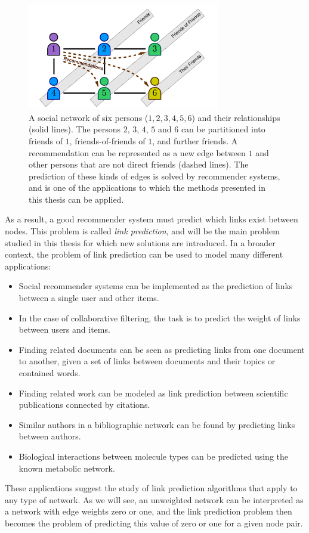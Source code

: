 \documentclass[11pt,a4paper]{book}
\newcommand{\wOnePointFive}{0.75}
\begin{document}
\begin{figure}[h!]
  \centering
  \includegraphics[width=\wOnePointFive\textwidth]{img-pdf/recommender}
  \caption{
    A social network of six persons ($1,2,3,4,5,6$) and
    their relationships (solid lines).  The persons $2$, $3$, $4$, $5$
    and $6$ can be partitioned into friends of $1$, friends-of-friends
    of $1$, and further friends.  A recommendation can be represented as
    a new edge between $1$ and other persons that are not direct friends
    (dashed lines).  The prediction of these kinds of edges is solved by
    recommender systems, and is one of the applications to which the
    methods presented in this thesis can be applied.
  }
  \label{fig:example-recommender}
\end{figure}

As a result, a good recommender system must predict which links exist
between nodes.  
This problem is called \emph{link prediction}, and will
be the main problem studied in this thesis for which new solutions are
introduced. 
In a broader context, the problem of
link prediction can be used to model many different applications: 
\begin{itemize}
\item Social recommender systems can be implemented as the prediction of
  links between a single user and other items. 
\item In the case of collaborative filtering, the task is to
  predict the weight of links between users and items. 
\item Finding related documents can be seen as predicting links from one
  document to another, given a set of links between documents and their topics or
  contained words. 
\item Finding related work can be modeled as link prediction between
  scientific publications connected by citations. 
\item Similar authors in a bibliographic network can be found by
  predicting links between authors. 
\item Biological interactions between molecule types can be predicted
  using the known metabolic network. 
\end{itemize}
These applications suggest the study of link prediction algorithms that
apply to any type of network.  As we will see, an unweighted network can
be interpreted as a network with edge weights zero or one, and the link
prediction problem then becomes the problem of predicting this value of
zero or one for a given node pair. 
\end{document}
